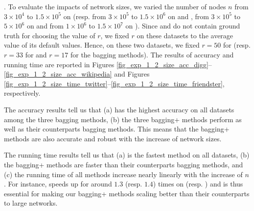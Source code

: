 . To evaluate the impacts of network sizes, we varied the
number of nodes $n$ from $3\times 10^4$ to $1.5\times 10^5$ on \Digg (resp.
from $3\times 10^5$ to $1.5\times 10^6$ on \YouTube and \Wikipedia,
from $3\times 10^5$ to $5\times 10^6$ on \Twitter and
from $1\times 10^6$ to $1.5\times 10^7$ on \Friendster).
Since \Twitter and \Friendster do not contain ground truth for choosing the value of $r$,
we fixed $r$ on these datasets to the average value of
its default values. Hence, on these two datasets, we fixed $r = 50$ for \NMF
(resp. $r = 33$ for \BIGCLAM and $r = 17$ for the bagging methods). The results
of accuracy and running time are reported in Figures \ref{fig_exp_1_2_size_acc_digg}--\ref{fig_exp_1_2_size_acc_wikipedia}
and Figures \ref{fig_exp_1_2_size_time_twitter}--\ref{fig_exp_1_2_size_time_friendster}, respectively.



The accuracy results tell us that (a) \Biased has the highest accuracy on all
datasets among the three bagging methods, (b) the three bagging+ methods perform as well as their counterparts
bagging methods. This means that the bagging+ methods are also accurate and
robust with the increase of network sizes.

The running time results tell us that (a) \Biasedp is the fastest method on all
datasets, (b) the bagging+ methods are faster than their counterparts bagging
methods, and (c) the running time of all methods increase nearly linearly with the
increase of $n$. For instance, \Biasedp speeds up \Biased for around
$1.3$ (resp. $1.4$) times on \Twitter (resp. \Friendster) and is thus essential for
making our bagging+ methods scaling better than their counterparts to large networks.





